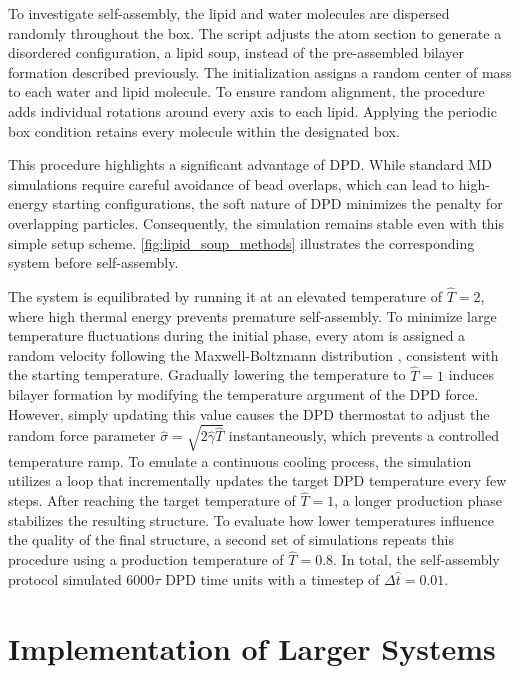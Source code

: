 \documentclass[
    11pt,
    a4paper,
    oneside,        %
    BCOR=10mm,      %
    parskip=half,   %
    listof=nototoc,   %
    bibliography=totoc %
]{scrreprt}
\begin{document}
To investigate self-assembly, the lipid and water molecules are dispersed randomly throughout the box. The script adjusts the atom section to generate a disordered configuration, a lipid soup, instead of the pre-assembled bilayer formation described previously.
The initialization assigns a random center of mass to each water and lipid molecule. To ensure random alignment, the procedure adds individual rotations around every axis to each lipid. Applying the periodic box condition retains every molecule within the designated box. 

This procedure highlights a significant advantage of DPD. While standard MD simulations require careful avoidance of bead overlaps, which can lead to high-energy starting configurations, the soft nature of DPD minimizes the penalty for overlapping particles. Consequently, the simulation remains stable even with this simple setup scheme. \cref{fig:lipid_soup_methods} illustrates the corresponding system before self-assembly.

The system is equilibrated by running it at an elevated temperature of $\hat{T} = 2$, where high thermal energy prevents premature self-assembly. To minimize large temperature fluctuations during the initial phase, every atom is assigned a random velocity following the Maxwell-Boltzmann distribution \cite{Allen2017_verlet}, consistent with the starting temperature. Gradually lowering the temperature to $\hat{T} = 1$ induces bilayer formation by modifying the temperature argument of the DPD force. However, simply updating this value causes the DPD thermostat to adjust the random force parameter $\hat{\sigma} = \sqrt{2\hat{\gamma}\hat{T}}$ instantaneously, which prevents a controlled temperature ramp. To emulate a continuous cooling process, the simulation utilizes a loop that incrementally updates the target DPD temperature every few steps. After reaching the target temperature of $\hat{T} = 1$, a longer production phase stabilizes the resulting structure. To evaluate how lower temperatures influence the quality of the final structure, a second set of simulations repeats this procedure using a production temperature of $\hat{T} = 0.8$. In total, the self-assembly protocol simulated $6000\tau$ DPD time units with a timestep of $\Delta \hat{t} = 0.01$.

\section{Implementation of Larger Systems}\label{sec:larger_systems}
\end{document}
